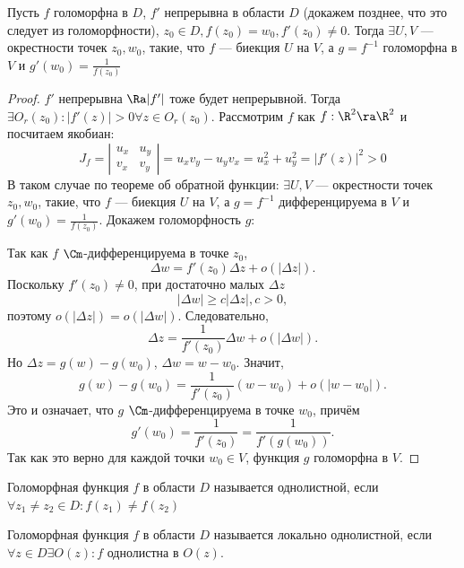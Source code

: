 \begin{theorem}
    Пусть \(f\) голоморфна в \(D\), \(f'\) непрерывна в области \(D\) (докажем позднее, что это следует из голоморфности), \(z_0 \in D, f(z_0) = w_0, f'(z_0) \ne 0\). Тогда \(\exists U, V\) --- окрестности точек \(z_0, w_0\), такие, что \(f\) --- биекция \(U\) на \(V\), а \(g = f^{-1}\) голоморфна в \(V\) и \(g'(w_0) = \frac{1}{f(z_0)}\)
\end{theorem}
\begin{proof}
    \(f'\) непрерывна \(\Ra |f'|\) тоже будет непрерывной. Тогда \(\exists O_r(z_0): |f'(z)| > 0 \forall z \in O_r(z_0)\). Рассмотрим \(f\) как \(f: \R^2 \ra \R^2\) и посчитаем якобиан:
    \[J_f = \left| \begin{array}{cc}
        u_x & u_y \\
        v_x & v_y
    \end{array} \right| = u_xv_y - u_yv_x = u_x^2 + u_y^2 = |f'(z)|^2 > 0\]
    В таком случае по теореме об обратной функции: \(\exists U, V\) --- окрестности точек \(z_0, w_0\), такие, что \(f\) --- биекция \(U\) на \(V\), а \(g = f^{-1}\) дифференцируема в \(V\) и \(g'(w_0) = \frac{1}{f(z_0)}\). Докажем голоморфность \(g\):

    Так как \(f\) \(\Cm\)-дифференцируема в точке \(z_0\),
    \[
        \Delta w=f'(z_0)\Delta z+o(|\Delta z|).
    \]
    Поскольку \(f'(z_0)\ne 0\), при достаточно малых \(\Delta z\)
    \[
        |\Delta w|\ge c|\Delta z|,  c>0,
    \]
    поэтому \(o(|\Delta z|)=o(|\Delta w|)\). Следовательно,
    \[
        \Delta z=\frac{1}{f'(z_0)}\Delta w+o(|\Delta w|).
    \]
    Но \(\Delta z=g(w)-g(w_0)\), \(\Delta w=w-w_0\). Значит,
    \[
        g(w)-g(w_0)=\frac{1}{f'(z_0)}(w-w_0)+o(|w-w_0|).
    \]
    Это и означает, что \(g\) \(\Cm\)-дифференцируема в точке \(w_0\), причём
    \[
        g'(w_0)=\frac{1}{f'(z_0)}=\frac{1}{f'(g(w_0))}.
    \]
    Так как это верно для каждой точки \(w_0\in V\), функция \(g\) голоморфна в \(V\).
\end{proof}

\begin{definition}
    Голоморфная функция \(f\) в области \(D\) называется однолистной, если \(\forall z_1 \ne z_2 \in D: f(z_1) \ne f(z_2)\)
\end{definition}

\begin{definition}
    Голоморфная функция \(f\) в области \(D\) называется локально однолистной, если \(\forall z \in D \exists O(z): f\) однолистна в \(O(z)\).
\end{definition}


